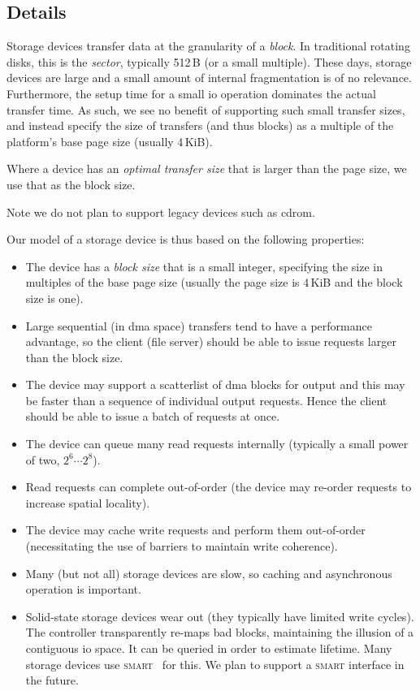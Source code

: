 \documentclass[a4paper,12pt]{report}
\begin{document}
\subsection{Details}

Storage devices transfer data at the granularity of a \emph{block}.
In traditional rotating disks, this is the \emph{sector}, typically
512\,B (or a small multiple). These days, storage devices are large
and a small amount of internal fragmentation is of no
relevance. Furthermore, the setup time for a small \gls{io} operation
dominates the actual transfer time. As such, we see no benefit of
supporting such small transfer sizes, and instead specify the size of
transfers (and thus blocks) as a multiple of the platform's base page
size (usually 4\,KiB).

Where a device has an \emph{optimal transfer size} that is larger than
the page size, we use that as the block size.

Note we do not plan to support legacy devices such as \gls{cdrom}.

Our model of a storage device is thus based on the following properties:
\begin{itemize}
\item The device has a \emph{block size} that is a small integer,
  specifying the size in multiples of the
  base page size (usually the page size is 4\,KiB and the block size
  is one).
\item Large sequential (in \gls{dma} space) transfers tend to have a
  performance advantage, so the client (file server) should be able to issue
  requests larger than the block size.
\item The device may support a scatterlist of \gls{dma} blocks for output
  and this may be faster than a sequence of individual output
  requests. Hence the client should be able to issue a batch of
  requests at once.
\item The device can queue many read requests internally (typically a small power
  of two, \(2^6\cdots2^8\)).
\item Read requests can complete out-of-order (the device may re-order
  requests to increase spatial locality).
\item The device may cache write requests and perform them out-of-order
  (necessitating the use of barriers to maintain write coherence).
\item Many (but not all) storage devices are slow, so caching and
  asynchronous operation is important.
\item Solid-state storage devices wear out (they typically have
  limited write cycles). The controller transparently re-maps bad
  blocks, maintaining the illusion of a contiguous \gls{io} space. It can
  be queried in order to estimate lifetime.  Many storage devices use
  \textsc{smart}~\citep{smart:url}  for this. We plan to support a
  \textsc{smart} interface in the future.
\end{itemize}
\end{document}
